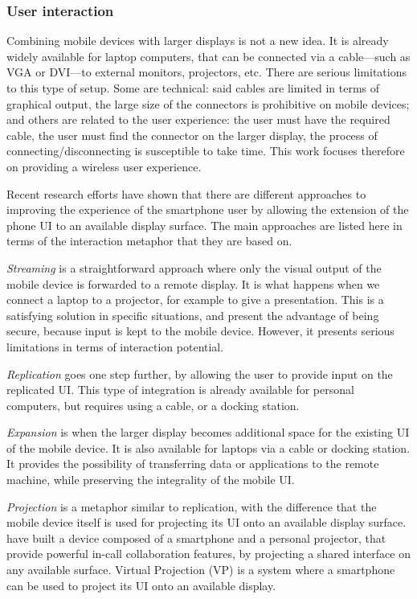 \subsubsection{User interaction}


Combining mobile devices with larger displays is not a new idea.
It is already widely available for laptop computers, that can be connected via a cable---such as VGA or DVI---to external monitors, projectors, etc.
There are serious limitations to this type of setup.
Some are technical: said cables are limited in terms of graphical output, the large size of the connectors is prohibitive on mobile devices; and others are related to the user experience: the user must have the required cable, the user must find the connector on the larger display, the process of connecting/disconnecting is susceptible to take time.
This work focuses therefore on providing a wireless user experience.

Recent research efforts have shown that there are different approaches to improving the experience of the smartphone user by allowing the extension of the phone UI to an available display surface.
The main approaches are listed here in terms of the interaction metaphor that they are based on.

\emph{Streaming} is a straightforward approach where only the visual output of the mobile device is forwarded to a remote display.
It is what happens when we connect a laptop to a projector, for example to give a presentation.
This is a satisfying solution in specific situations, and present the advantage of being secure, because input is kept to the mobile device.
However, it presents serious limitations in terms of interaction potential.

\emph{Replication} goes one step further, by allowing the user to provide input on the replicated UI.
This type of integration is already available for personal computers, but requires using a cable, or a docking station.

\emph{Expansion} is when the larger display becomes additional space for the existing UI of the mobile device.
It is also available for laptops via a cable or docking station.
It provides the possibility of transferring data or applications to the remote  machine, while preserving the integrality of the mobile UI.

\emph{Projection} is a metaphor similar to replication, with the difference that the mobile device itself is used for projecting its UI onto an available display surface.
\cite{Winkler:2011:interactivephonecall} have built a device composed of a smartphone and a personal projector, that provide powerful in-call collaboration features, by projecting a shared interface on any available surface.
Virtual Projection (VP) \citep{Baur:2012:virtualprojection} is a system where a smartphone can be used to project its UI onto an available display.

